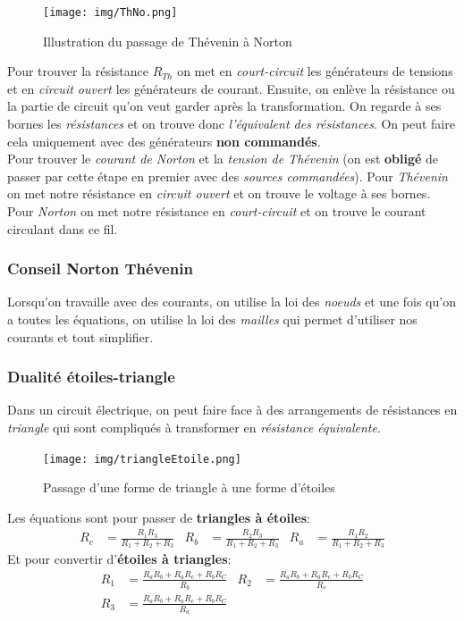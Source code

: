 \documentclass{report}
\begin{document}
\begin{figure}[H]
\centering
\texttt{[image: img/ThNo.png]}
\caption{Illustration du passage de Thévenin à Norton}
\end{figure}
Pour trouver la résistance $R_{Th}$ on met en \textit{court-circuit} les générateurs de tensions et en \textit{circuit ouvert} les générateurs de courant. Ensuite, on enlève la résistance ou la partie de circuit qu'on veut garder après la transformation. On regarde à ses bornes les \textit{résistances} et on trouve donc \textit{l'équivalent des résistances}. On peut faire cela uniquement avec des générateurs \textbf{non commandés}.\\

Pour trouver le \textit{courant de Norton} et la \textit{tension de Thévenin} (on est \textbf{obligé} de passer par cette étape en premier avec des \textit{sources commandées}). Pour \textit{Thévenin} on met notre résistance en \textit{circuit ouvert} et on trouve le voltage à ses bornes.\\
Pour \textit{Norton} on met notre résistance en \textit{court-circuit} et on trouve le courant circulant dans ce fil.

\subsubsection{Conseil Norton Thévenin}
Lorsqu'on travaille avec des courants, on utilise la loi des \textit{noeuds} et une fois qu'on a toutes les équations, on utilise la loi des \textit{mailles} qui permet d'utiliser nos courants et tout simplifier.\\

\subsubsection{Dualité étoiles-triangle}
Dans un circuit électrique, on peut faire face à des arrangements de résistances en \textit{triangle} qui sont compliqués à transformer en \textit{résistance équivalente}. 
\begin{figure}[H]
\centering
\texttt{[image: img/triangleEtoile.png]}
\caption{Passage d'une forme de triangle à une forme d'étoiles}
\end{figure}
Les équations sont pour passer de \textbf{triangles à étoiles}:
\begin{align*}
R_c &= \frac{R_1  R_3}{R_1 + R_2 + R_3} & R_b &= \frac{R_2  R_3}{R_1 + R_2 + R_3} & R_a &= \frac{R_1  R_2}{R_1 + R_2 + R_3}
\end{align*}
Et pour convertir d'\textbf{étoiles à triangles}:
\begin{align*}
R_1 &= \frac{R_aR_b + R_aR_c + R_bR_C}{R_b} & R_2 &= \frac{R_aR_b + R_aR_c + R_bR_C}{R_c} \\
R_3 &= \frac{R_aR_b + R_aR_c + R_bR_C}{R_a}
\end{align*}
\end{document}
